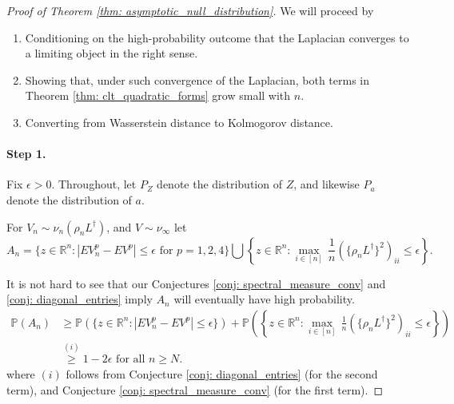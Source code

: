\documentclass{article}
\newcommand{\Prob}[1]{\mathbb{P}\left( #1 \right)}
\newcommand{\abs}[1]{\left \lvert #1 \right \rvert}
\newcommand{\set}[1]{\left\{#1\right\}}
\newcommand{\Linv}{L^{\dagger}}
\theoremstyle{alden}
\theoremstyle{definition}
\theoremstyle{remark}
\begin{document}
\begin{proof}[Proof of Theorem \ref{thm: asymptotic_null_distribution}]
	We will proceed by
	\begin{enumerate}
		\item Conditioning on the high-probability outcome that the Laplacian converges to a limiting object in the right sense.
		\item Showing that, under such convergence of the Laplacian, both terms in Theorem \ref{thm: clt_quadratic_forms} grow small with $n$.
		\item Converting from Wasserstein distance to Kolmogorov distance. 
	\end{enumerate}
	
	\paragraph{Step 1.}
	Fix $\epsilon > 0$. Throughout, let $P_Z$ denote the distribution of $Z$, and likewise $P_a$ denote the distribution of $a$.
	
	For  $V_n \sim \nu_n(\rho_n \Linv)$, and $V \sim \nu_{\infty}$ let
	\begin{equation*}
	A_n = \biggl \{z \in \mathbb{R}^n: \abs{ E V_n^p - E V^p } \leq \epsilon \text{ for } p = 1, 2, 4 \biggr \} \bigcup \set{ z \in \mathbb{R}^n: \underset{i \in [n]}{\max} \, \frac{1}{n} \left(\{ \rho_n \Linv\}^2 \right)_{ii} \leq \epsilon}.
	\end{equation*}
	
	It is not hard to see that our Conjectures \ref{conj: spectral_measure_conv} and \ref{conj: diagonal_entries} imply $A_n$ will eventually have high probability.
	\begin{align}
	\label{eqn: good_event_probability}
	\Prob{A_n} & \geq \Prob{\biggl \{z \in \mathbb{R}^n: \abs{ E V_n^p - E V^p } \leq \epsilon \biggr \}} + \Prob{\set{ z \in \mathbb{R}^n: \underset{i \in [n]}{\max} \, \frac{1}{n} \left(\{ \rho_n \Linv\}^2 \right)_{ii} \leq \epsilon}} \nonumber \\
	& \overset{(i)}{\geq} 1 - 2 \epsilon \text{ for all } n \geq N.
	\end{align}
	where $(i)$ follows from Conjecture \ref{conj: diagonal_entries} (for the second term), and Conjecture \ref{conj: spectral_measure_conv} (for the first term).
	

\end{proof}
\end{document}
